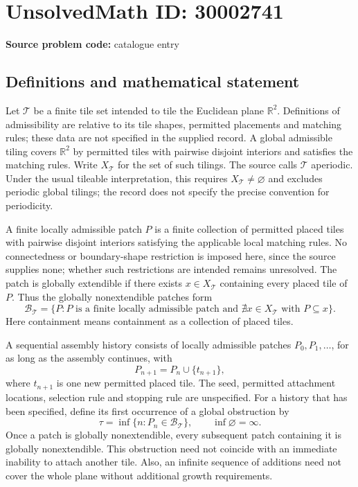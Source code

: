 \documentclass[11pt]{article}
\newcommand{\R}{\mathbb{R}}
\begin{document}
\section*{UnsolvedMath ID: 30002741}
\textbf{Source problem code:} catalogue entry
\subsection{Definitions and mathematical statement}
Let \(\mathcal T\) be a finite tile set intended to tile the Euclidean plane \(\R^2\). Definitions of admissibility are relative to its tile shapes, permitted placements and matching rules; these data are not specified in the supplied record. A global admissible tiling covers \(\R^2\) by permitted tiles with pairwise disjoint interiors and satisfies the matching rules. Write \(X_{\mathcal T}\) for the set of such tilings. The source calls \(\mathcal T\) aperiodic. Under the usual tileable interpretation, this requires \(X_{\mathcal T}\ne\varnothing\) and excludes periodic global tilings; the record does not specify the precise convention for periodicity.

A finite locally admissible patch \(P\) is a finite collection of permitted placed tiles with pairwise disjoint interiors satisfying the applicable local matching rules. No connectedness or boundary-shape restriction is imposed here, since the source supplies none; whether such restrictions are intended remains unresolved. The patch is globally extendible if there exists \(x\in X_{\mathcal T}\) containing every placed tile of \(P\). Thus the globally nonextendible patches form
\[
\mathcal B_{\mathcal T}=\{P: P\text{ is a finite locally admissible patch and }\nexists x\in X_{\mathcal T}\text{ with }P\subseteq x\}.
\]
Here containment means containment as a collection of placed tiles.

A sequential assembly history consists of locally admissible patches \(P_0,P_1,\ldots\), for as long as the assembly continues, with
\[
P_{n+1}=P_n\cup\{t_{n+1}\},
\]
where \(t_{n+1}\) is one new permitted placed tile. The seed, permitted attachment locations, selection rule and stopping rule are unspecified. For a history that has been specified, define its first occurrence of a global obstruction by
\[
\tau=\inf\{n:P_n\in\mathcal B_{\mathcal T}\},\qquad \inf\varnothing=\infty.
\]
Once a patch is globally nonextendible, every subsequent patch containing it is globally nonextendible. This obstruction need not coincide with an immediate inability to attach another tile. Also, an infinite sequence of additions need not cover the whole plane without additional growth requirements.
\end{document}
